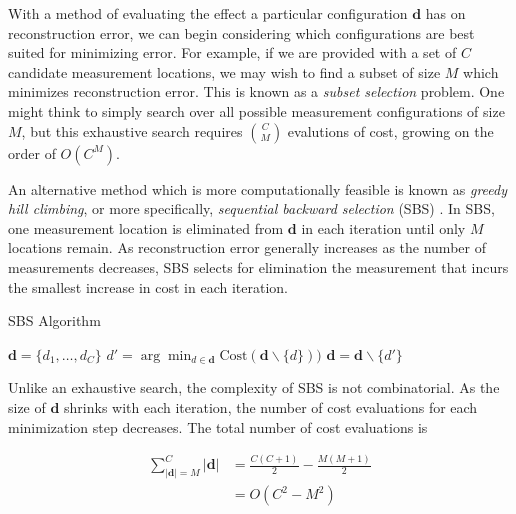 \documentclass{article}
\begin{document}
With a method of evaluating the effect a particular configuration $\bm{d}$ has
on reconstruction error, we can begin considering which configurations are best
suited for minimizing error.  For example, if we are provided with a set of $C$
candidate measurement locations, we may wish to find a subset of size $M$ which
minimizes reconstruction error. This is known as a \emph{subset selection} problem.
One might think to simply search over all possible measurement configurations
of size $M$, but this exhaustive search requires $\binom{C}{M}$ evalutions of
cost, growing on the order of $O(C^M)$.

An alternative method which is more computationally feasible is known as
\emph{greedy hill climbing}, or more specifically, \emph{sequential backward
selection} (SBS) \cite{sharif}. In SBS, one measurement location is eliminated from $\bm{d}$ in each
iteration until only $M$ locations remain. As reconstruction error generally
increases as the number of measurements decreases, SBS selects for elimination the
measurement that incurs the smallest increase in cost in each iteration.

\begin{algorithm}
  \begin{algorithmic}
    \caption{SBS Algorithm}
    \State $\bm{d} = \{d_1, \dots, d_C\}$
    \Repeat
      \State $d' = \arg \min_{d \in \bm{d}} \text{Cost}(\bm{d} \backslash \{d\}))$
      \State $\bm{d} = \bm{d} \backslash \{d'\}$
  \end{algorithmic}
\end{algorithm}

Unlike an exhaustive search, the complexity of SBS is not combinatorial.  As the
size of $\bm{d}$ shrinks with each iteration, the number of cost evaluations for each
minimization step decreases.  The total number of cost evaluations is

$$
\begin{aligned}
  \sum_{|\bm{d}| = M}^C |\bm{d}|
  &= \frac{C
    (C + 1)}{2} - \frac{M(M + 1)}{2} \\
  &= O(C^2 - M^2)
\end{aligned}
$$
\end{document}
